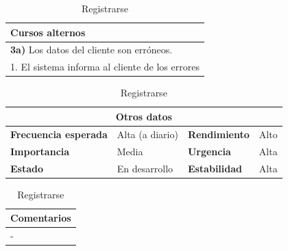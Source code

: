 \documentclass[12pt,spanish]{article}
\begin{document}
\begin{table}[H]
\vspace{1cm}

\begin{tabular}{|m{10pt}|m{7.15cm}|m{10pt}|m{7.15cm}|}
\hline
\multicolumn{4}{|m{16.2cm}|}{\textbf{Cursos alternos}} \\
\hline
\multicolumn{4}{|m{16.2cm}|}{\textbf{3a)} Los datos del cliente son erróneos.} \\
\hline
\multicolumn{4}{|m{16.2cm}|}{1. El sistema informa al cliente de los errores}\\
\hline
\end{tabular}

\vspace{1cm}

\begin{tabular}{|m{3.72cm}|m{3.72cm}|m{3.72cm}|m{3.72cm}|}
\hline
\multicolumn{4}{|c|}{\textbf{Otros datos}} \\
\hline
\textbf{Frecuencia esperada} & Alta (a diario) & \textbf{Rendimiento} & Alto \\
\hline
\textbf{Importancia} & Media & \textbf{Urgencia} & Alta \\
\hline
\textbf{Estado} & En desarrollo & \textbf{Estabilidad} & Alta \\
\hline
\end{tabular}

\vspace{1cm}

\begin{tabular}{|m{16.2cm}|}
\hline
\textbf{Comentarios} \\
\hline
- \\
\hline
\end{tabular}

\caption{Registrarse}

\end{table}


\end{document}
